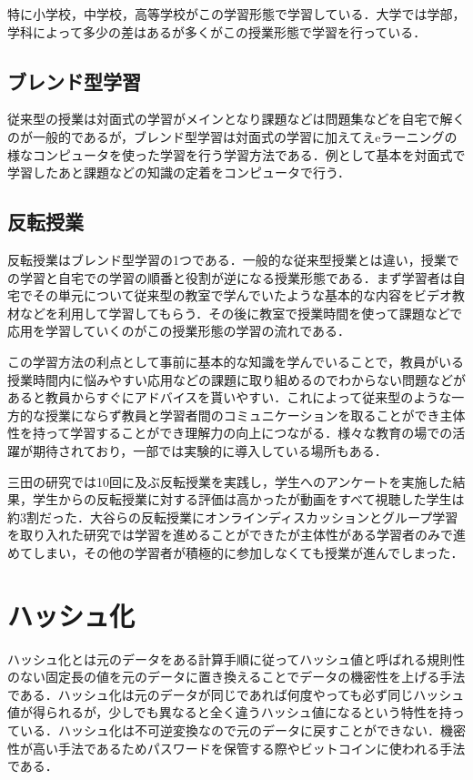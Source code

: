 \documentclass[a4j,11pt]{jsarticle}
\begin{document}
特に小学校，中学校，高等学校がこの学習形態で学習している．大学では学部，学科によって多少の差はあるが多くがこの授業形態で学習を行っている．

\subsection{ブレンド型学習}
従来型の授業は対面式の学習がメインとなり課題などは問題集などを自宅で解くのが一般的であるが，ブレンド型学習は対面式の学習に加えてえeラーニングの様なコンピュータを使った学習を行う学習方法である．例として基本を対面式で学習したあと課題などの知識の定着をコンピュータで行う．\newpage

\subsection{反転授業}
反転授業はブレンド型学習の1つである．一般的な従来型授業とは違い，授業での学習と自宅での学習の順番と役割が逆になる授業形態である．まず学習者は自宅でその単元について従来型の教室で学んでいたような基本的な内容をビデオ教材などを利用して学習してもらう．その後に教室で授業時間を使って課題などで応用を学習していくのがこの授業形態の学習の流れである．

この学習方法の利点として事前に基本的な知識を学んでいることで，教員がいる授業時間内に悩みやすい応用などの課題に取り組めるのでわからない問題などがあると教員からすぐにアドバイスを貰いやすい．これによって従来型のような一方的な授業にならず教員と学習者間のコミュニケーションを取ることができ主体性を持って学習することができ理解力の向上につながる．様々な教育の場での活躍が期待されており，一部では実験的に導入している場所もある．

三田\cite{1}の研究では10回に及ぶ反転授業を実践し，学生へのアンケートを実施した結果，学生からの反転授業に対する評価は高かったが動画をすべて視聴した学生は約3割だった．大谷ら\cite{2}の反転授業にオンラインディスカッションとグループ学習を取り入れた研究では学習を進めることができたが主体性がある学習者のみで進めてしまい，その他の学習者が積極的に参加しなくても授業が進んでしまった．

\newpage

\section{ハッシュ化}
ハッシュ化とは元のデータをある計算手順に従ってハッシュ値と呼ばれる規則性のない固定長の値を元のデータに置き換えることでデータの機密性を上げる手法である．ハッシュ化は元のデータが同じであれば何度やっても必ず同じハッシュ値が得られるが，少しでも異なると全く違うハッシュ値になるという特性を持っている．ハッシュ化は不可逆変換なので元のデータに戻すことができない．機密性が高い手法であるためパスワードを保管する際やビットコインに使われる手法である．
\end{document}
